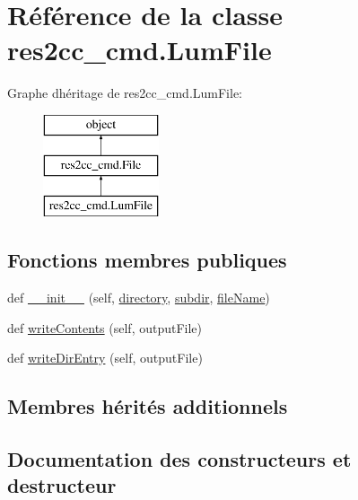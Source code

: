 \hypertarget{classres2cc__cmd_1_1_lum_file}{}\section{Référence de la classe res2cc\+\_\+cmd.\+Lum\+File}
\label{classres2cc__cmd_1_1_lum_file}
Graphe d\textquotesingle{}héritage de res2cc\+\_\+cmd.\+Lum\+File\+:\begin{figure}[H]
\begin{center}
\leavevmode
\includegraphics[height=3.000000cm]{classres2cc__cmd_1_1_lum_file}
\end{center}
\end{figure}
\subsection*{Fonctions membres publiques}
\begin{DoxyCompactItemize}
\item 
def \hyperlink{classres2cc__cmd_1_1_lum_file_a8714ca37abb677d9c8343592113a6786}{\+\_\+\+\_\+init\+\_\+\+\_\+} (self, \hyperlink{classres2cc__cmd_1_1_file_ac4d2f8723afe8f54e99abc605b1f0cc6}{directory}, \hyperlink{classres2cc__cmd_1_1_file_ae6919ea0849ff51ff2679de78b50f44c}{subdir}, \hyperlink{classres2cc__cmd_1_1_file_ae2daaffd697b334701ec4a53d6c5e86d}{file\+Name})
\item 
def \hyperlink{classres2cc__cmd_1_1_lum_file_aa3c05d203a13c04a5259ca7f3edaa960}{write\+Contents} (self, output\+File)
\item 
def \hyperlink{classres2cc__cmd_1_1_lum_file_af003eaadd7b3b39188752e647856f059}{write\+Dir\+Entry} (self, output\+File)
\end{DoxyCompactItemize}
\subsection*{Membres hérités additionnels}


\subsection{Documentation des constructeurs et destructeur}
\hypertarget{classres2cc__cmd_1_1_lum_file_a8714ca37abb677d9c8343592113a6786}{}
